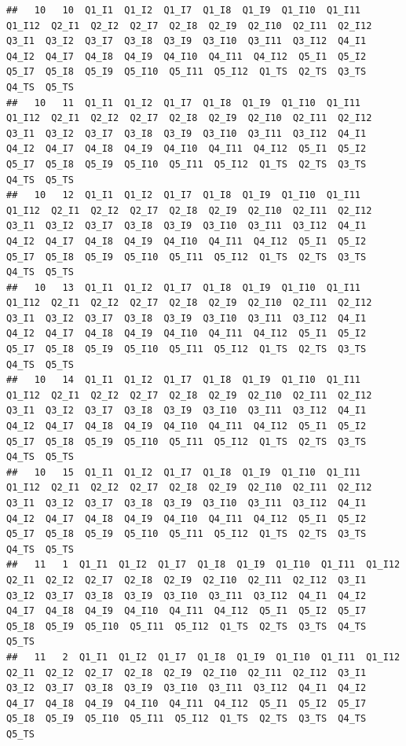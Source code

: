 \documentclass[]{book}
\begin{document}
\begin{verbatim}
##   10   10  Q1_I1  Q1_I2  Q1_I7  Q1_I8  Q1_I9  Q1_I10  Q1_I11  Q1_I12  Q2_I1  Q2_I2  Q2_I7  Q2_I8  Q2_I9  Q2_I10  Q2_I11  Q2_I12  Q3_I1  Q3_I2  Q3_I7  Q3_I8  Q3_I9  Q3_I10  Q3_I11  Q3_I12  Q4_I1  Q4_I2  Q4_I7  Q4_I8  Q4_I9  Q4_I10  Q4_I11  Q4_I12  Q5_I1  Q5_I2  Q5_I7  Q5_I8  Q5_I9  Q5_I10  Q5_I11  Q5_I12  Q1_TS  Q2_TS  Q3_TS  Q4_TS  Q5_TS
##   10   11  Q1_I1  Q1_I2  Q1_I7  Q1_I8  Q1_I9  Q1_I10  Q1_I11  Q1_I12  Q2_I1  Q2_I2  Q2_I7  Q2_I8  Q2_I9  Q2_I10  Q2_I11  Q2_I12  Q3_I1  Q3_I2  Q3_I7  Q3_I8  Q3_I9  Q3_I10  Q3_I11  Q3_I12  Q4_I1  Q4_I2  Q4_I7  Q4_I8  Q4_I9  Q4_I10  Q4_I11  Q4_I12  Q5_I1  Q5_I2  Q5_I7  Q5_I8  Q5_I9  Q5_I10  Q5_I11  Q5_I12  Q1_TS  Q2_TS  Q3_TS  Q4_TS  Q5_TS
##   10   12  Q1_I1  Q1_I2  Q1_I7  Q1_I8  Q1_I9  Q1_I10  Q1_I11  Q1_I12  Q2_I1  Q2_I2  Q2_I7  Q2_I8  Q2_I9  Q2_I10  Q2_I11  Q2_I12  Q3_I1  Q3_I2  Q3_I7  Q3_I8  Q3_I9  Q3_I10  Q3_I11  Q3_I12  Q4_I1  Q4_I2  Q4_I7  Q4_I8  Q4_I9  Q4_I10  Q4_I11  Q4_I12  Q5_I1  Q5_I2  Q5_I7  Q5_I8  Q5_I9  Q5_I10  Q5_I11  Q5_I12  Q1_TS  Q2_TS  Q3_TS  Q4_TS  Q5_TS
##   10   13  Q1_I1  Q1_I2  Q1_I7  Q1_I8  Q1_I9  Q1_I10  Q1_I11  Q1_I12  Q2_I1  Q2_I2  Q2_I7  Q2_I8  Q2_I9  Q2_I10  Q2_I11  Q2_I12  Q3_I1  Q3_I2  Q3_I7  Q3_I8  Q3_I9  Q3_I10  Q3_I11  Q3_I12  Q4_I1  Q4_I2  Q4_I7  Q4_I8  Q4_I9  Q4_I10  Q4_I11  Q4_I12  Q5_I1  Q5_I2  Q5_I7  Q5_I8  Q5_I9  Q5_I10  Q5_I11  Q5_I12  Q1_TS  Q2_TS  Q3_TS  Q4_TS  Q5_TS
##   10   14  Q1_I1  Q1_I2  Q1_I7  Q1_I8  Q1_I9  Q1_I10  Q1_I11  Q1_I12  Q2_I1  Q2_I2  Q2_I7  Q2_I8  Q2_I9  Q2_I10  Q2_I11  Q2_I12  Q3_I1  Q3_I2  Q3_I7  Q3_I8  Q3_I9  Q3_I10  Q3_I11  Q3_I12  Q4_I1  Q4_I2  Q4_I7  Q4_I8  Q4_I9  Q4_I10  Q4_I11  Q4_I12  Q5_I1  Q5_I2  Q5_I7  Q5_I8  Q5_I9  Q5_I10  Q5_I11  Q5_I12  Q1_TS  Q2_TS  Q3_TS  Q4_TS  Q5_TS
##   10   15  Q1_I1  Q1_I2  Q1_I7  Q1_I8  Q1_I9  Q1_I10  Q1_I11  Q1_I12  Q2_I1  Q2_I2  Q2_I7  Q2_I8  Q2_I9  Q2_I10  Q2_I11  Q2_I12  Q3_I1  Q3_I2  Q3_I7  Q3_I8  Q3_I9  Q3_I10  Q3_I11  Q3_I12  Q4_I1  Q4_I2  Q4_I7  Q4_I8  Q4_I9  Q4_I10  Q4_I11  Q4_I12  Q5_I1  Q5_I2  Q5_I7  Q5_I8  Q5_I9  Q5_I10  Q5_I11  Q5_I12  Q1_TS  Q2_TS  Q3_TS  Q4_TS  Q5_TS
##   11   1  Q1_I1  Q1_I2  Q1_I7  Q1_I8  Q1_I9  Q1_I10  Q1_I11  Q1_I12  Q2_I1  Q2_I2  Q2_I7  Q2_I8  Q2_I9  Q2_I10  Q2_I11  Q2_I12  Q3_I1  Q3_I2  Q3_I7  Q3_I8  Q3_I9  Q3_I10  Q3_I11  Q3_I12  Q4_I1  Q4_I2  Q4_I7  Q4_I8  Q4_I9  Q4_I10  Q4_I11  Q4_I12  Q5_I1  Q5_I2  Q5_I7  Q5_I8  Q5_I9  Q5_I10  Q5_I11  Q5_I12  Q1_TS  Q2_TS  Q3_TS  Q4_TS  Q5_TS
##   11   2  Q1_I1  Q1_I2  Q1_I7  Q1_I8  Q1_I9  Q1_I10  Q1_I11  Q1_I12  Q2_I1  Q2_I2  Q2_I7  Q2_I8  Q2_I9  Q2_I10  Q2_I11  Q2_I12  Q3_I1  Q3_I2  Q3_I7  Q3_I8  Q3_I9  Q3_I10  Q3_I11  Q3_I12  Q4_I1  Q4_I2  Q4_I7  Q4_I8  Q4_I9  Q4_I10  Q4_I11  Q4_I12  Q5_I1  Q5_I2  Q5_I7  Q5_I8  Q5_I9  Q5_I10  Q5_I11  Q5_I12  Q1_TS  Q2_TS  Q3_TS  Q4_TS  Q5_TS

\end{verbatim}
\end{document}
